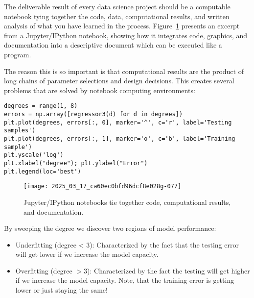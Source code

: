 \documentclass[10pt]{article}
\begin{document}
The deliverable result of every data science project should be a computable notebook tying together the code, data, computational results, and written analysis of what you have learned in the process. Figure~\ref{fig:jupyter-fig} presents an excerpt from a Jupyter/IPython notebook, showing how it integrates code, graphics, and documentation into a descriptive document which can be executed like a program.

The reason this is so important is that computational results are the product of long chains of parameter selections and design decisions. This creates several problems that are solved by notebook computing environments:

\begin{verbatim}
degrees = range(1, 8)
errors = np.array([regressor3(d) for d in degrees])
plt.plot(degrees, errors[:, 0], marker='^', c='r', label='Testing samples')
plt.plot(degrees, errors[:, 1], marker='o', c='b', label='Training sample')
plt.yscale('log')
plt.xlabel("degree"); plt.ylabel("Error")
plt.legend(loc='best')
\end{verbatim}

\begin{figure}[h!]
    \centering
    \texttt{[image: 2025\_03\_17\_ca60ec0bfd96dcf8e028g-077]}
    \caption{Jupyter/IPython notebooks tie together code, computational results, and documentation.}
    \label{fig:jupyter-fig}
\end{figure}

By sweeping the degree we discover two regions of model performance:

\begin{itemize}
  \item Underfitting (degree < 3): Characterized by the fact that the testing error will get lower if we increase the model capacity.
  \item Overfitting (degree $>3$): Characterized by the fact the testing will get higher if we increase the model capacity. Note, that the training error is getting lower or just staying the same!
\end{itemize}
\end{document}
